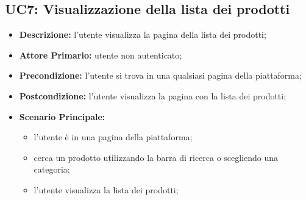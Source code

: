 \subsection{UC7: Visualizzazione della lista dei prodotti}
\label{sec:UC7}
\begin{itemize}
    \item \textbf{Descrizione:} l'utente visualizza la pagina della lista dei prodotti;
    \item \textbf{Attore Primario:} utente non autenticato;
    \item \textbf{Precondizione:} l'utente si trova in una qualsiasi pagina della piattaforma;
    \item \textbf{Postcondizione:} l'utente visualizza la pagina con la lista dei prodotti;
    \item \textbf{Scenario Principale:}
          \begin{itemize}
              \item l'utente è in una pagina della piattaforma;
              \item cerca un prodotto utilizzando la barra di ricerca o scegliendo una categoria;
              \item l'utente visualizza la lista dei prodotti;
          \end{itemize}
\end{itemize}
